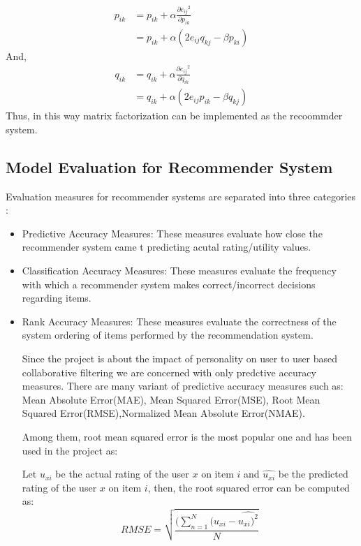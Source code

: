 \begin{equation}
\begin{split}
	p_{ik} &= p_{ik} + \alpha \frac{\partial {e_{ij}}^2}{\partial p_{ik}} \\ 
	& = p_{ik}  + \alpha (2e_{ij} q_{kj} - \beta p_{ki})
\end{split}
\end{equation}
And,
\begin{equation}
\begin{split}
	q_{ik} &= q_{ik} + \alpha \frac{\partial {e_{ij}}^2}{\partial q_{ik}} \\ 
	& = q_{ik}  + \alpha (2e_{ij} p_{ik} - \beta q_{kj})
\end{split}
\end{equation}
Thus, in this way matrix factorization can be implemented as the recoommder system.
\subsection{Model Evaluation for Recommender System}
Evaluation measures for recommender systems are separated into three categories \cite{eval}:
\begin{itemize}
	\item Predictive Accuracy Measures: These measures evaluate how close the recommender system came t predicting acutal rating/utility values.
	\item Classification Accuracy Measures: These measures evaluate the frequency with which a recommender system makes correct/incorrect decisions regarding items.
	\item Rank Accuracy Measures: These measures evaluate the correctness of the system ordering of items performed by the recommendation system.

	Since the project is about the impact of personality on user to user based collaborative filtering we are concerned with only predctive accuracy measures. There are many variant of predictive accuracy measures such as: Mean Absolute Error(MAE), Mean Squared Error(MSE), Root Mean Squared Error(RMSE),Normalized Mean Absolute Error(NMAE).

Among them, root mean squared error is the most popular one and has been used in the project as:

Let $u_{xi}$ be the actual rating of the user $x$ on item $i$ and $\widehat{u_{xi}}$ be the predicted rating of the user $x$ on item $i$, then, the root squared error can be computed as:
\begin{equation}
	RMSE = \sqrt{\frac{(\sum_{n=1}^N(u_{xi}-\widehat{u_{xi})^2}}{N}}
\end{equation}
\end{itemize}
